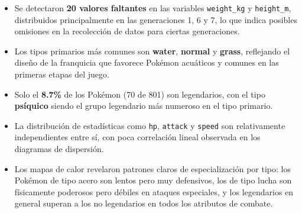 \documentclass[11pt,a4paper]{article}
\begin{document}
\begin{itemize}
  \item Se detectaron \textbf{20 valores faltantes} en las variables \texttt{weight\_kg} y
    \texttt{height\_m}, distribuidos principalmente en las generaciones 1, 6 y 7, lo que indica
    posibles omisiones en la recolección de datos para ciertas generaciones.

  \item Los tipos primarios más comunes son \textbf{water}, \textbf{normal} y \textbf{grass},
    reflejando el diseño de la franquicia que favorece Pokémon acuáticos y comunes en las primeras
    etapas del juego.

  \item Solo el \textbf{8.7\%} de los Pokémon (70 de 801) son legendarios, con el tipo
    \textbf{psíquico} siendo el grupo legendario más numeroso en el tipo primario.

  \item La distribución de estadísticas como \texttt{hp}, \texttt{attack} y \texttt{speed} son
    relativamente independientes entre sí, con poca correlación lineal observada en los
    diagramas de dispersión.

  \item Los mapas de calor revelaron patrones claros de especialización por tipo: los Pokémon
    de tipo acero son lentos pero muy defensivos, los de tipo lucha son físicamente poderosos
    pero débiles en ataques especiales, y los legendarios en general superan a los no legendarios
    en todos los atributos de combate.
\end{itemize}
\end{document}
